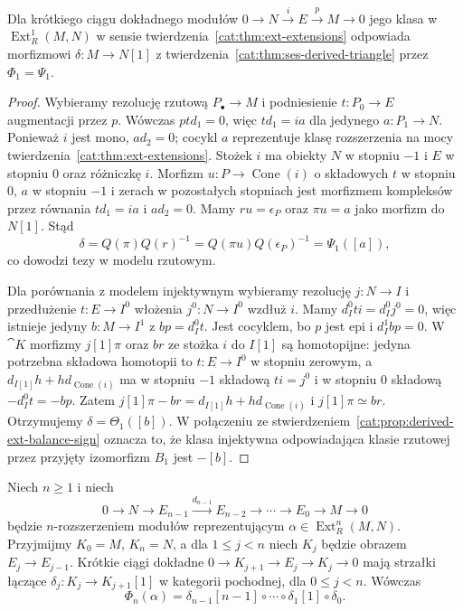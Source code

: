 \begin{wniosek}\label{cat:cor:derived-extension-class}
Dla krótkiego ciągu dokładnego modułów $0\to N\xrightarrow i E\xrightarrow p M\to0$ jego klasa w $\operatorname{Ext}_R^1(M,N)$ w sensie twierdzenia~\ref{cat:thm:ext-extensions} odpowiada morfizmowi $\delta:M\to N[1]$ z twierdzenia~\ref{cat:thm:ses-derived-triangle} przez $\Phi_1=\Psi_1$.
\end{wniosek}
\begin{proof}
Wybieramy rezolucję rzutową $P_\bullet\to M$ i podniesienie $t:P_0\to E$ augmentacji przez $p$. Wówczas $ptd_1=0$, więc $td_1=ia$ dla jedynego $a:P_1\to N$. Ponieważ $i$ jest mono, $ad_2=0$; cocykl $a$ reprezentuje klasę rozszerzenia na mocy twierdzenia~\ref{cat:thm:ext-extensions}. Stożek $i$ ma obiekty $N$ w stopniu $-1$ i $E$ w stopniu $0$ oraz różniczkę $i$. Morfizm $u:P\to\operatorname{Cone}(i)$ o składowych $t$ w stopniu $0$, $a$ w stopniu $-1$ i zerach w pozostałych stopniach jest morfizmem kompleksów przez równania $td_1=ia$ i $ad_2=0$. Mamy $ru=\epsilon_P$ oraz $\pi u=a$ jako morfizm do $N[1]$. Stąd
\[
 \delta=Q(\pi)Q(r)^{-1}
       =Q(\pi u)Q(\epsilon_P)^{-1}=\Psi_1([a]),
\]
co dowodzi tezy w modelu rzutowym.

Dla porównania z modelem injektywnym wybieramy rezolucję $j:N\to I$ i przedłużenie $t:E\to I^0$ włożenia $j^0:N\to I^0$ wzdłuż $i$. Mamy $d_I^0ti=d_I^0j^0=0$, więc istnieje jedyny $b:M\to I^1$ z $bp=d_I^0t$. Jest cocyklem, bo $p$ jest epi i $d_I^1bp=0$. W $\cat K$ morfizmy $j[1]\pi$ oraz $br$ ze stożka $i$ do $I[1]$ są homotopijne: jedyna potrzebna składowa homotopii to $t:E\to I^0$ w stopniu zerowym, a $d_{I[1]}h+hd_{\operatorname{Cone}(i)}$ ma w stopniu $-1$ składową $ti=j^0$ i w stopniu $0$ składową $-d_I^0t=-bp$. Zatem $j[1]\pi-br=d_{I[1]}h+hd_{\operatorname{Cone}(i)}$ i $j[1]\pi\simeq br$. Otrzymujemy $\delta=\Theta_1([b])$. W połączeniu ze stwierdzeniem~\ref{cat:prop:derived-ext-balance-sign} oznacza to, że klasa injektywna odpowiadająca klasie rzutowej przez przyjęty izomorfizm $B_1$ jest $-[b]$.
\end{proof}
\begin{wniosek}\label{cat:cor:derived-higher-extensions}
Niech $n\ge1$ i niech
\[
 0\to N\to E_{n-1}\xrightarrow{d_{n-1}}E_{n-2}
 \to\cdots\to E_0\to M\to0
\]
będzie $n$-rozszerzeniem modułów reprezentującym $\alpha\in\operatorname{Ext}_R^n(M,N)$. Przyjmijmy $K_0=M$, $K_n=N$, a dla $1\le j<n$ niech $K_j$ będzie obrazem $E_j\to E_{j-1}$. Krótkie ciągi dokładne $0\to K_{j+1}\to E_j\to K_j\to0$ mają strzałki łączące $\delta_j:K_j\to K_{j+1}[1]$ w kategorii pochodnej, dla $0\le j<n$. Wówczas
\[
 \Phi_n(\alpha)=
 \delta_{n-1}[n-1]\circ\cdots\circ\delta_1[1]\circ\delta_0.
\]
\end{wniosek}
